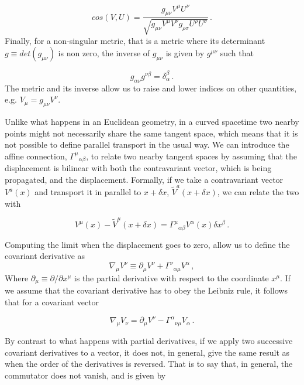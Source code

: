 \begin{equation}
    cos(V, U) = \frac{g_{\mu \nu} V^\mu U^\nu}{\sqrt{g_{\mu \nu} V^\mu V^\nu g_{\rho \sigma} U^\rho U^\sigma}} \,.
\end{equation}
Finally, for a non-singular metric, that is a metric where its determinant $g \equiv det(g_{\mu \nu})$ is non zero, the inverse of $g_{\mu \nu}$ is given by $g^{\mu \nu}$ such that

\begin{equation}
    g_{\alpha \nu} g^{\nu \beta} = \delta^\beta_\alpha \,.
\end{equation}
The metric and its inverse allow us to raise and lower indices on other quantities, e.g. $V_\mu = g_{\mu \nu} V^\nu$.

Unlike what happens in an Euclidean geometry, in a curved spacetime two nearby points might not necessarily share the same tangent space, which means that it is not possible to define parallel transport in the usual way. We can introduce the affine connection, $\Gamma^\mu{}_{\alpha \beta}$, to relate two nearby tangent spaces by assuming that the displacement is bilinear with both the contravariant vector, which is being propagated, and the displacement. Formally, if we take a contravariant vector $V^a(x)$ and transport it in parallel to $x + \delta x$, $\tilde{V}^a(x + \delta x)$, we can relate the two with

\begin{equation}
    V^\mu(x) - \tilde{V}^\mu (x + \delta x) = \Gamma^\mu{}_{\alpha \beta} V^\alpha (x) \delta x^\beta \,.
\end{equation}

\noindent Computing the limit when the displacement goes to zero, allow us to define the covariant derivative as
\begin{equation}
    \nabla_\mu V^\nu \equiv \partial_\mu V^\nu + \Gamma^\nu{}_{\alpha \mu} V^\alpha \,,
\end{equation}
Where $\partial_\mu \equiv \partial/\partial x^\mu$ is the partial derivative with respect to the coordinate $x^\mu$. If we assume that the covariant derivative has to obey the Leibniz rule, it follows that for a covariant vector

\begin{equation}
    \nabla_\mu V_\nu = \partial_\mu V^\nu - \Gamma^\alpha{}_{\nu \mu} V_\alpha \,.
\end{equation}

By contrast to what happens with partial derivatives, if we apply two successive covariant derivatives to a vector, it does not, in general, give the same result as when the order of the derivatives is reversed. That is to say that, in general, the commutator does not vanish, and is given by

